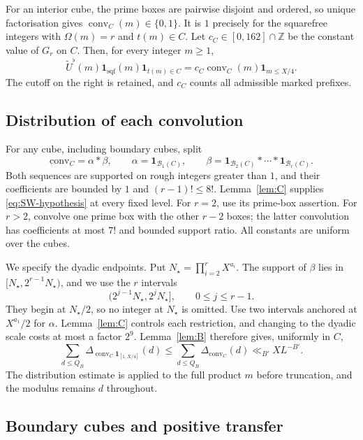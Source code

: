 \documentclass{amsart}
\newcounter{fact}
\numberwithin{equation}{section}
\numberwithin{table}{section}
\newcommand{\Z}{\mathbb Z}
\newcommand{\ind}{\mathbf 1}
\newcommand{\conv}{\operatorname{conv}}
\begin{document}
For an interior cube, the prime boxes are pairwise disjoint and ordered,
so unique factorisation gives $\conv_C(m)\in\{0,1\}$. It is $1$ precisely for the squarefree integers with $\Omega(m)=r$ and $t(m)\in C$.
Let $c_C\in[0,162]\cap\Z$ be the constant value of $G_r$ on $C$. Then,
for every integer $m\ge1$,
\begin{equation}\label{eq:interior-identity}
\widetilde U^\flat(m)\ind_{\mathrm{sqf}}(m)\ind_{t(m)\in C}
=c_C\conv_C(m)\ind_{m\le X/4}.
\end{equation}
The cutoff on the right is retained, and $c_C$ counts all admissible
marked prefixes.

\subsection{Distribution of each convolution}

For any cube, including boundary cubes, split
\[
\mathrm{conv}_C=\alpha*\beta,\qquad
\alpha=\ind_{\mathcal B_1(C)},\qquad
\beta=\ind_{\mathcal B_2(C)}*\cdots*\ind_{\mathcal B_r(C)}.
\]
Both sequences are supported on rough integers greater than $1$, and
their coefficients are bounded by $1$ and $(r-1)!\le8!$.
Lemma~\ref{lem:C} supplies \eqref{eq:SW-hypothesis} at every fixed level.
For $r=2$, use its prime-box assertion. For $r>2$, convolve one prime box
with the other $r-2$ boxes; the latter convolution has coefficients at
most $7!$ and bounded support ratio.
All constants are uniform over the cubes.

We specify the dyadic endpoints.
Put $N_\star=\prod_{i=2}^rX^{a_i}$. The support of $\beta$ lies in
$[N_\star,2^{r-1}N_\star)$, and we use the $r$ intervals
\[
(2^{j-1}N_\star,2^jN_\star],\qquad 0\le j\le r-1.
\]
They begin at $N_\star/2$, so no integer at $N_\star$ is omitted.
Use two intervals anchored at $X^{a_1}/2$ for $\alpha$.
Lemma~\ref{lem:C} controls each restriction, and changing to the dyadic
scale costs at most a factor $2^9$.
Lemma~\ref{lem:B} therefore gives, uniformly in $C$,
\begin{equation}\label{eq:cube-BV}
\sum_{d\le Q_B}\Delta_{\conv_C\ind_{[1,X/4]}}(d)
\le\sum_{d\le Q_B}\Delta_{\conv_C}(d)\ll_{B'}XL^{-B'}.
\end{equation}
The distribution estimate is applied to the full product $m$ before
truncation, and the modulus remains $d$ throughout.

\subsection{Boundary cubes and positive transfer}
\end{document}
